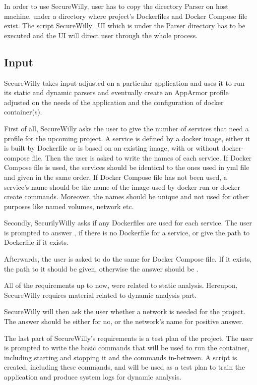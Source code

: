 In order to use SecureWilly, user has to copy the directory Parser on host machine, under a directory where project's Dockerfiles and Docker Compose file exist. The script SecureWilly\_UI which is under the Parser directory has to be executed and the UI will direct user through the whole process.

\subsection{Input}
SecureWilly takes input adjusted on a particular application and uses it to run its static and dynamic parsers and eventually create an AppArmor profile adjusted on the needs of the application and the configuration of docker container(s).

First of all, SecureWilly asks the user to give the number of services that need a profile for the upcoming project. A service is defined by a docker image, either it is built by Dockerfile or is based on an existing image, with or without docker-compose file. Then the user is asked to write the names of each service. If Docker Compose file is used, the services should be identical to the ones used in yml file and given in the same order. If Docker Compose file has not been used, a service's name should be the name of the image used by docker run or docker create commands. Moreover, the names should be unique and not used for other purposes like named volumes, network etc.

Secondly, SecurilyWilly asks if any Dockerfiles are used for each service. The user is prompted to answer , if there is no Dockerfile for a service, or give the path to Dockerfile if it exists.

Afterwards, the user is asked to do the same for Docker Compose file. If it exists, the path to it should be given, otherwise the answer should be .

All of the requirements up to now, were related to static analysis. Hereupon, SecureWilly requires material related to dynamic analysis part.

SecureWilly will then ask the user whether a network is needed for the project. The answer should be either  for no, or the network's name for positive answer.

The last part of SecureWilly's requirements is a test plan of the project. The user is prompted to write the basic commands that will be used to run the container, including starting and stopping it and the commands in-between. A script is created, including these commands, and will be used as a test plan to train the application and produce system logs for dynamic analysis.

